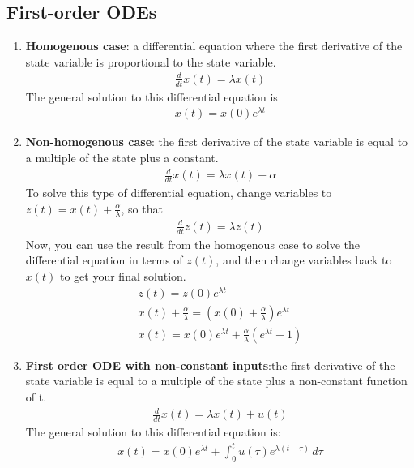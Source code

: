 \subsection*{First-order ODEs}
\begin{enumerate}
    \item \textbf{Homogenous case}: a differential equation where the first derivative of the state variable is proportional to the state variable.
    \begin{align*}
        \frac{d}{dt} x(t) = \lambda x(t)
    \end{align*}
    The general solution to this differential equation is
    \begin{align*}
        x(t) = x(0) e^{\lambda t}
    \end{align*}

    \item \textbf{Non-homogenous case}: the first derivative of the state variable is equal to a multiple of the state plus a constant.
    \begin{align*}
        \frac{d}{dt} x(t) = \lambda x(t) + \alpha
    \end{align*}
    To solve this type of differential equation, change variables to $z(t) = x(t) + \frac{\alpha}{\lambda}$, so that
    \begin{align*}
        \frac{d}{dt} z(t) = \lambda z(t)
    \end{align*}
    Now, you can use the result from the homogenous case to solve the differential equation in terms of $z(t)$, and then change variables back to $x(t)$ to get your final solution.
    \begin{align*}
        z(t) = z(0) e^{\lambda t} \\
        x(t) + \frac{\alpha}{\lambda} = (x(0) + \frac{\alpha}{\lambda}) e^{\lambda t} \\
        x(t) = x(0) e^{\lambda t} + \frac{\alpha}{\lambda}(e^{\lambda t} - 1)
    \end{align*}

    \item \textbf{First order ODE with non-constant inputs}:the first derivative of the state variable is equal to a multiple of the state plus a non-constant function of t.
    \begin{align*}
        \frac{d}{dt} x(t) = \lambda x(t) + u(t)
    \end{align*}
    The general solution to this differential equation is:
    \begin{align*}
        x(t) = x(0) e^{\lambda t} + \int_0^t u(\tau) e^{\lambda(t - \tau)} \, d\tau
    \end{align*}

\end{enumerate}

